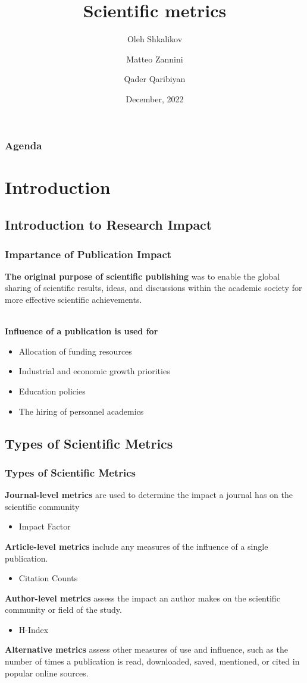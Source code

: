 \documentclass{beamer}
\title{Scientific metrics}
\author[O. Shkalikov \and M. Zannini \and Q. Qaribiyan]
{Oleh Shkalikov \and Matteo Zannini \and Qader Qaribiyan}
\institute{TU Dresden, Computer Science Faculty}
\date{December, 2022}
\begin{document}
\frame{\titlepage}

\begin{frame}
    \frametitle{Agenda}
    \tableofcontents
\end{frame}

\section{Introduction}
\subsection{Introduction to Research Impact}
\begin{frame}
    \frametitle{Impartance of Publication Impact}
    \textbf{The original purpose of scientific publishing} was to enable the global sharing of scientific results, ideas, and discussions within the academic society for more effective scientific achievements.\\~\

    \textbf{Influence of a publication is used for}
    \begin{itemize}
        \item Allocation of funding resources
        \item Industrial and economic growth priorities
        \item Education policies
        \item The hiring of personnel academics
    \end{itemize}
\end{frame}

\subsection{Types of Scientific Metrics }
\begin{frame}
    \frametitle{Types of Scientific Metrics }
    \textbf{Journal-level metrics} are used to determine the impact a journal has on the scientific community
    \begin{itemize}
        \item Impact Factor
    \end{itemize}
    \textbf{Article-level metrics} include any measures of the influence of a single publication.
    \begin{itemize}
        \item Citation Counts
    \end{itemize}
    \textbf{Author-level metrics} assess the impact an author makes on the scientific community or field of the study.
    \begin{itemize}
        \item H-Index
    \end{itemize}
      \textbf{Alternative metrics} assess other measures of use and influence, such as the number of times a publication is read, downloaded, saved, mentioned, or cited in popular online sources.
\end{frame}
\end{document}
